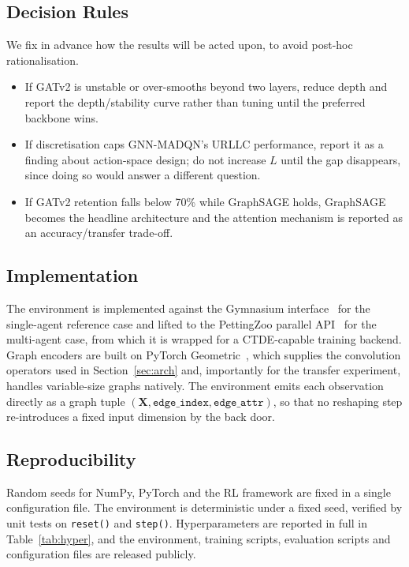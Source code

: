 \documentclass[journal]{IEEEtran}
\begin{document}
\subsection{Decision Rules}
We fix in advance how the results will be acted upon, to avoid
post-hoc rationalisation.

\begin{itemize}
\item If GATv2 is unstable or over-smooths beyond two layers, reduce
      depth and report the depth/stability curve rather than tuning
      until the preferred backbone wins.
\item If discretisation caps GNN-MADQN's URLLC performance, report it
      as a finding about action-space design; do not increase $L$ until
      the gap disappears, since doing so would answer a different
      question.
\item If GATv2 retention falls below 70\% while GraphSAGE holds,
      GraphSAGE becomes the headline architecture and the attention
      mechanism is reported as an accuracy/transfer trade-off.
\end{itemize}

\subsection{Implementation}
The environment is implemented against the Gymnasium
interface~\cite{towers2024gymnasium} for the single-agent reference
case and lifted to the PettingZoo parallel
API~\cite{terry2021pettingzoo} for the multi-agent case, from which it
is wrapped for a CTDE-capable training backend. Graph encoders are
built on PyTorch Geometric~\cite{fey2019pyg}, which supplies the
convolution operators used in Section~\ref{sec:arch} and, importantly
for the transfer experiment, handles variable-size graphs natively. The
environment emits each observation directly as a graph tuple
$(\mathbf{X}, \texttt{edge\_index}, \texttt{edge\_attr})$, so that no
reshaping step re-introduces a fixed input dimension by the back door.

\subsection{Reproducibility}
Random seeds for NumPy, PyTorch and the RL framework are fixed in a
single configuration file. The environment is deterministic under a
fixed seed, verified by unit tests on \texttt{reset()} and
\texttt{step()}. Hyperparameters are reported in full in
Table~\ref{tab:hyper}, and the environment, training scripts, evaluation
scripts and configuration files are released publicly.
\end{document}

